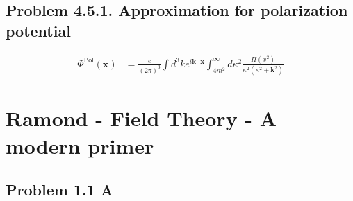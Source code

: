 \documentclass[../main.tex]{subfiles}
\begin{document}
\subsection{Problem 4.5.1. Approximation for polarization potential}

\begin{align}
\Phi^\text{Pol}(\mathbf{x})
&=\frac{e}{(2\pi)^3}\int d^3k e^{i\mathbf{k}\cdot\mathbf{x}}\int_{4m^2}^\infty d\kappa^2\frac{\Pi(x^2)}{\kappa^2(\kappa^2+\mathbf{k}^2)}
\end{align}


\section{{\sc Ramond} - Field Theory - A modern primer} 
\subsection{Problem 1.1 A}
\end{document}
